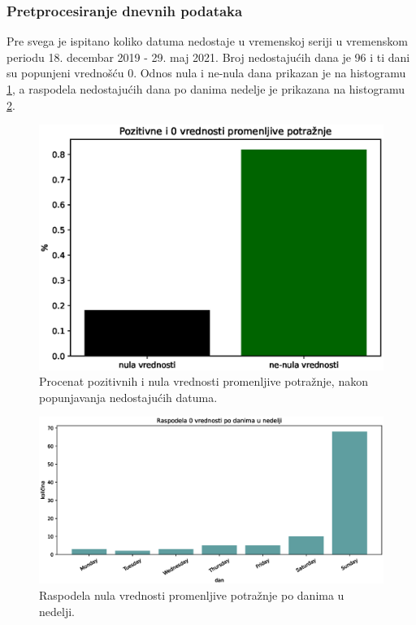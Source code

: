 \documentclass[12pt,oneside]{memoir}
\begin{document}
\subsubsection{Pretprocesiranje dnevnih podataka}
Pre svega je ispitano koliko datuma nedostaje u vremenskoj seriji u vremenskom periodu 18. decembar 2019 - 29. maj 2021. Broj nedostajućih dana je 96 i ti dani su popunjeni vrednošću 0. Odnos nula i ne-nula dana prikazan je na histogramu \ref{fig: nula_nenula}, a raspodela nedostajućih dana po danima nedelje je prikazana na histogramu \ref{fig: dani_nedelje}. 

\begin{figure}[!ht]
  \centering
  \includegraphics[width=1\textwidth]{./grafici/nula_vrednosti_dnevni_podaci.eps}
  \caption{Procenat pozitivnih i nula vrednosti promenljive potražnje, nakon popunjavanja nedostajućih datuma.}
  \label{fig: nula_nenula}
\end{figure}

\begin{figure}[!ht]
  \centering
  \includegraphics[width=1\textwidth]{./grafici/nule_po_danima_nedelje.eps}
  \caption{Raspodela nula vrednosti promenljive potražnje po danima u nedelji.}
  \label{fig: dani_nedelje}
\end{figure}
\end{document}
